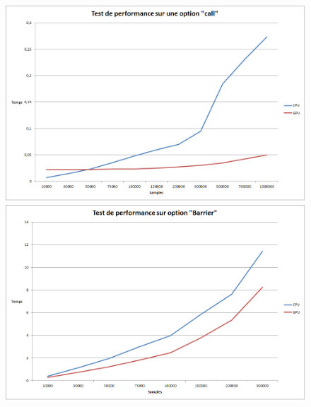 \documentclass[french,12pt,a4paper]{article}
\begin{document}
\begin{center}
\begin{figure}[h!]

   \begin{minipage}[c]{.46\linewidth}
\includegraphics[scale=0.3]{call.png}
   \end{minipage} \hfill
   \begin{minipage}[c]{.46\linewidth}
\includegraphics[scale=0.3]{barrier.png}
   \end{minipage}
\end{figure}
\end{center}
\end{document}
